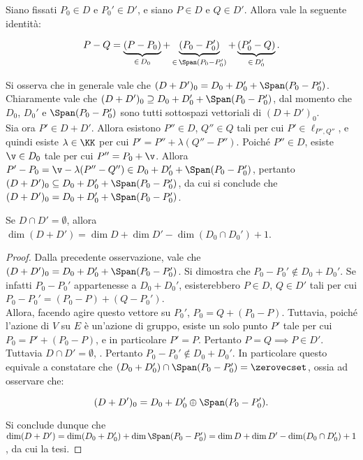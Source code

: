 \documentclass[11pt]{article}
\begin{document}
	\begin{remark}
		Siano fissati $P_0 \in D$ e $P_0' \in D'$, e siano $P \in D$ e
		$Q \in D'$. Allora vale la seguente identità:
		
		\[ P - Q = \underbrace{(P - P_0)}_{\in \, D_0} + \underbrace{(P_0 - P_0')}_{\in \, \Span(P_0 - P_0')} + \underbrace{(P_0' - Q)}_{\in \, D_0'}. \]
		
		\vskip 0.05in
		
		Si osserva che in generale vale che $(D + D')_0 = D_0 + D_0' + \Span(P_0 - P_0')$. Chiaramente vale che $(D + D')_0 \supseteq D_0 + D_0' + \Span(P_0 - P_0')$, dal momento che $D_0$, $D_0'$ e $\Span(P_0 - P_0')$ sono tutti sottospazi vettoriali di $(D + D')_0$. \\
		
		Sia ora $P' \in D + D'$. Allora esistono $P'' \in D$, $Q'' \in Q$ tali
		per cui $P' \in \ell_{P'', Q''}$, e quindi esiste $\lambda \in \KK$
		per cui $P' = P'' + \lambda (Q'' - P'')$. Poiché $P'' \in D$,
		esiste $\v \in D_0$ tale per cui $P'' = P_0 + \v$. Allora
		$P' - P_0 = \v - \lambda (P'' - Q'') \in D_0 + D_0' + \Span(P_0 - P_0')$, pertanto $(D + D')_0 \subseteq D_0 + D_0' + \Span(P_0 - P_0')$,
		da cui si conclude che $(D + D')_0 = D_0 + D_0' + \Span(P_0 - P_0')$.
	\end{remark}

	\begin{proposition} 
		Se $D \cap D' = \emptyset$, allora $\dim (D + D') = \dim D + \dim D' -
		\dim (D_0 \cap D_0') + 1$.
	\end{proposition}

	\begin{proof}
		Dalla precedente osservazione, vale che $(D + D')_0 = D_0 + D_0' + \Span(P_0 - P_0')$. Si dimostra che $P_0 - P_0' \notin D_0 + D_0'$.
		Se infatti $P_0 - P_0'$ appartenesse a $D_0 + D_0'$, esisterebbero
		$P \in D$, $Q \in D'$ tali per cui $P_0 - P_0' = (P_0 - P) + (Q - P_0')$. \\
		
		Allora, facendo agire questo vettore su $P_0'$,
		$P_0 = Q + (P_0 - P)$. Tuttavia, poiché l'azione di $V$ su $E$
		è un'azione di gruppo, esiste un solo punto $P'$ tale per
		cui $P_0 = P' + (P_0 - P)$, e in particolare $P' = P$. Pertanto
		$P = Q \implies P \in D'$. Tuttavia $D \cap D' = \emptyset$, \Lightning. Pertanto $P_0 - P_0' \notin D_0 + D_0'$.
		In particolare questo equivale a constatare che
		$(D_0 + D_0') \cap \Span(P_0 - P_0') = \zerovecset$,
		ossia ad osservare che:
		
		\[ (D + D')_0 = D_0 + D_0' \oplus \Span(P_0 - P_0'). \]
		
		\vskip 0.1in
		
		Si conclude dunque che $\dim (D + D') = \dim (D_0 + D_0') + \dim \Span(P_0 - P_0') =
		\dim D + \dim D' - \dim (D_0 \cap D_0') + 1$, da cui la tesi.
	\end{proof}
\end{document}
